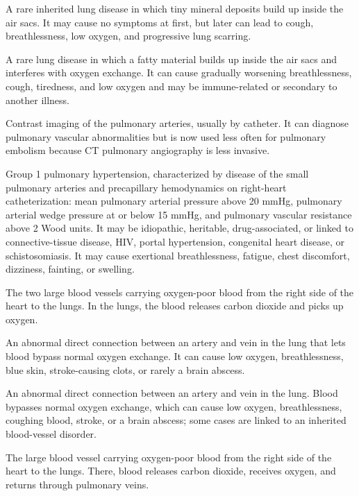  A rare inherited lung disease in which tiny mineral deposits build up inside the air sacs. It may cause no symptoms at first, but later can lead to cough, breathlessness, low oxygen, and progressive lung scarring.

 A rare lung disease in which a fatty material builds up inside the air sacs and interferes with oxygen exchange. It can cause gradually worsening breathlessness, cough, tiredness, and low oxygen and may be immune-related or secondary to another illness.

 Contrast imaging of the pulmonary arteries, usually by catheter. It can diagnose pulmonary vascular abnormalities but is now used less often for pulmonary embolism because CT pulmonary angiography is less invasive.

 Group 1 pulmonary hypertension, characterized by disease of the small pulmonary arteries
and precapillary hemodynamics on right-heart catheterization: mean pulmonary arterial pressure above 20 mmHg,
pulmonary arterial wedge pressure at or below 15 mmHg, and pulmonary vascular resistance above 2 Wood units.
It may be idiopathic, heritable, drug-associated, or linked to connective-tissue disease, HIV, portal hypertension,
congenital heart disease, or schistosomiasis.
It may cause exertional breathlessness, fatigue, chest discomfort, dizziness, fainting, or swelling.

 The two large blood vessels carrying oxygen-poor blood from the right side of the heart to the lungs. In the lungs, the blood releases carbon dioxide and picks up oxygen.


 An abnormal direct connection between an artery and vein in the lung that lets blood bypass normal oxygen exchange. It can cause low oxygen, breathlessness, blue skin, stroke-causing clots, or rarely a brain abscess.

 An abnormal direct connection between an artery and vein in the lung. Blood bypasses normal oxygen exchange, which can cause low oxygen, breathlessness, coughing blood, stroke, or a brain abscess; some cases are linked to an inherited blood-vessel disorder.

 The large blood vessel carrying oxygen-poor blood from the right side of the heart to the lungs. There, blood releases carbon dioxide, receives oxygen, and returns through pulmonary veins.

